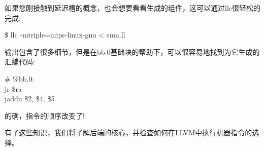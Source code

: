 如果您刚接触到延迟槽的概念，也会想要看看生成的组件，这可以通过llc很轻松的完成:\par

\begin{tcolorbox}[colback=white,colframe=black]
\$ llc -mtriple=mips-linux-gnu  < sum.ll
\end{tcolorbox}

输出包含了很多细节，但是在bb.0基础块的帮助下，可以很容易地找到为它生成的汇编代码:\par

\begin{tcolorbox}[colback=white,colframe=black]
\# \%bb.0: \\
\hspace*{2cm}jr\hspace{1cm} \$ra \\
\hspace*{2cm}jaddu\hspace{0.5cm} \$2, \$4, \$5
\end{tcolorbox}

的确，指令的顺序改变了!\par

有了这些知识，我们将了解后端的核心，并检查如何在LLVM中执行机器指令的选择。\par











